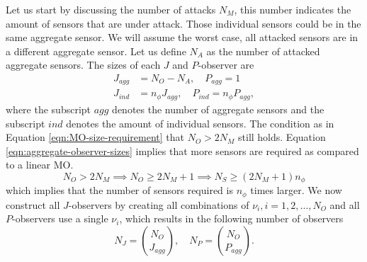 Let us start by discussing the number of attacks $N_M$, this number indicates the amount of sensors that are under attack. Those individual sensors could be in the same aggregate sensor. We will assume the worst case, all attacked sensors are in a different aggregate sensor. Let us define $N_A$ as the number of attacked aggregate sensors. The sizes of each $J$ and $P$-observer  are
\begin{equation}\label{eqn:aggregate-observer-sizes}
    \begin{split}
        J_{agg}&=N_O-N_A, \quad P_{agg}=1 \\
        J_{ind} &= n_{\phi}J_{agg}, \quad P_{ind} = n_{\phi}P_{agg},
    \end{split}
\end{equation}
where the subscript $agg$ denotes the number of aggregate sensors and the subscript $ind$ denotes the amount of individual sensors. The condition as in Equation \eqref{eqn:MO-size-requirement} that $N_O>2N_M$ still holds. Equation \eqref{eqn:aggregate-observer-sizes} implies that more sensors are required as compared to a linear MO. 
\begin{equation*}
    N_O > 2N_M \implies N_O \geq 2N_M + 1 \implies N_S \geq (2N_M + 1)n_{\phi}
\end{equation*}
which implies that the number of sensors required is $n_{\phi}$ times larger. We now construct all $J$-observers by creating all combinations of $\nu_i,i=1,2,\dots,N_O$ and all $P$-observers use a single $\nu_i$, which results in the following number of observers
\begin{equation*}
    N_J = \binom{N_O}{J_{agg}}, \quad N_P = \binom{N_O}{P_{agg}}.
\end{equation*}


